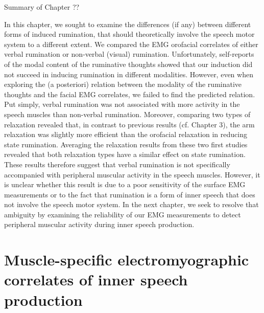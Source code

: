 \documentclass[a4paper,12pt,twoside,onecolumn,openright,final,oldfontcommands]{memoir}
\newcommand\getcurrentref[1]{
 \ifnumequal{\value{#1}}{0}
  {??}
  {\the\value{#1}}
}
\begin{document}
\begin{vplace}[1]

\begin{summary}{Summary of Chapter\getcurrentref{chapter}}

In this chapter, we sought to examine the differences (if any) between different forms of induced rumination, that should theoretically involve the speech motor system to a different extent. We compared the EMG orofacial correlates of either verbal rumination or non-verbal (visual) rumination. Unfortunately, self-reports of the modal content of the ruminative thoughts showed that our induction did not succeed in inducing rumination in different modalities. However, even when exploring the (a posteriori) relation between the modality of the ruminative thoughts and the facial EMG correlates, we failed to find the predicted relation. Put simply, verbal rumination was not associated with more activity in the speech muscles than non-verbal rumination. Moreover, comparing two types of relaxation revealed that, in contrast to previous results (cf. Chapter 3), the arm relaxation was slightly more efficient than the orofacial relaxation in reducing state rumination. Averaging the relaxation results from these two first studies revealed that both relaxation types have a similar effect on state rumination. These results therefore suggest that verbal rumination is not specifically accompanied with peripheral muscular activity in the speech muscles. However, it is unclear whether this result is due to a poor sensitivity of the surface EMG measurements or to the fact that rumination is a form of inner speech that does not involve the speech motor system. In the next chapter, we seek to resolve that ambiguity by examining the reliability of our EMG measurements to detect peripheral muscular activity during inner speech production.

\end{summary}

\end{vplace}

\hypertarget{chap5}{%
\chapter{Muscle-specific electromyographic correlates of inner speech production}\label{chap5}}
\end{document}
